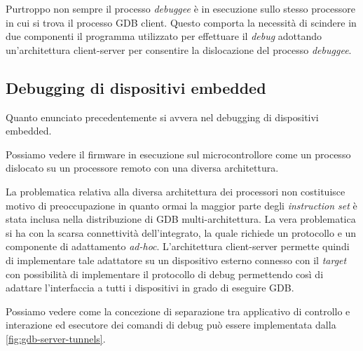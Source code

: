 Purtroppo non sempre il processo \textit{debuggee} è in esecuzione sullo stesso processore in cui si trova il processo GDB client. Questo comporta la necessità di scindere in due componenti il programma utilizzato per effettuare il \textit{debug} adottando un'architettura client-server per consentire la dislocazione del processo \textit{debuggee}.

\subsection{Debugging di dispositivi embedded}

Quanto enunciato precedentemente si avvera nel debugging di dispositivi embedded. 

Possiamo vedere il firmware in esecuzione sul microcontrollore come un processo dislocato su un processore remoto con una diversa architettura.

La problematica relativa alla diversa architettura dei processori non costituisce motivo di preoccupazione in quanto ormai la maggior parte degli \textit{instruction set} è stata inclusa nella distribuzione di GDB multi-architettura\cite{site:gdb}.
La vera problematica si ha con la scarsa connettività dell'integrato, la quale richiede un protocollo e un componente di adattamento \textit{ad-hoc}.
L'architettura client-server permette quindi di implementare tale adattatore su un dispositivo esterno connesso con il \textit{target} con possibilità di implementare il protocollo di debug permettendo così di adattare l'interfaccia a tutti i dispositivi in grado di eseguire GDB.\@ 

Possiamo vedere come la concezione di separazione tra applicativo di controllo e interazione ed esecutore dei comandi di debug può essere implementata dalla \cref{fig:gdb-server-tunnels}.


